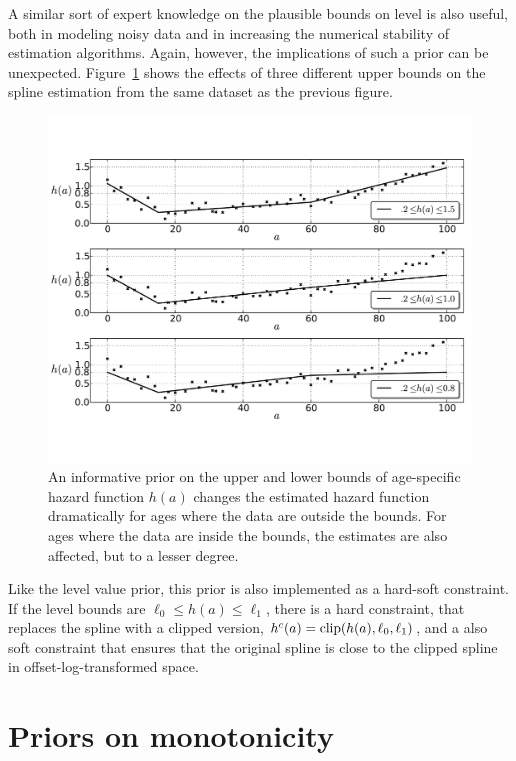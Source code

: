 A similar sort of expert knowledge on the plausible bounds on
level is also useful, both in modeling noisy data and in increasing
the numerical stability of estimation algorithms. Again, however, the
implications of such a prior can be unexpected.
Figure~\ref{level-bounds-priors} shows the effects of three different
upper bounds on the spline estimation from the same dataset as the
previous figure.

\begin{figure}[h]
\begin{center}
\includegraphics[width=\textwidth]{level_bound-smoothing-splines.pdf}
\caption{An informative prior on the upper and
lower bounds of age-specific hazard function $h(a)$ changes the estimated hazard function dramatically for
ages where the data are outside the bounds. For ages where the data are
inside the bounds, the estimates are also affected, but to a lesser
degree.}
\label{level-bounds-priors}
\end{center}
\end{figure}



Like the level value prior, this prior is also implemented as a
hard-soft constraint.  If the level bounds are $\ell_0 \leq h(a)
\leq \ell_1$, there is a hard constraint, that replaces the spline with a
clipped version, $h^c(a) = \operatorname{clip}(h(a), \ell_0, \ell_1)$, and a
also soft constraint that ensures that the original spline is close to the clipped
spline in offset-log-transformed space.

\section{Priors on monotonicity}

